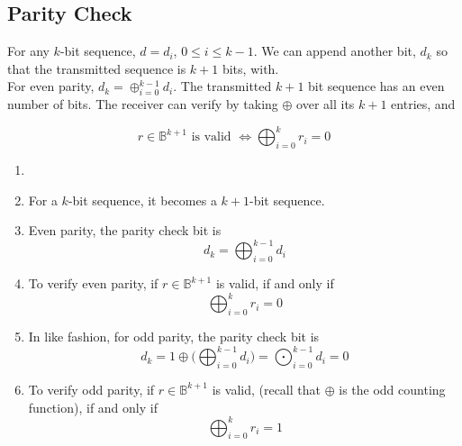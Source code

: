 \documentclass[../../main.tex]{subfiles}
\begin{document}
\subsection{Parity Check}
\begin{definition}
    For any $k$-bit sequence, $d = d_i$, $0\leq i\leq k-1$. We can append another bit, $d_k$ so that the transmitted sequence is $k+1$ bits, with. \\
    
    For even parity, $d_k = \oplus_{i=0}^{k-1}d_i$. The transmitted $k+1$ bit sequence has an even number of bits. The receiver can verify by taking $\oplus$ over all its $k+1$ entries, and 
\end{definition}
    
    \[
    r\in\mathbb{B}^{k+1}\text{ is valid }\iff \bigoplus_{i=0}^{k}r_i = 0
    \]
\begin{wtr}
\begin{enumerate}
    \item[]
    \item For a $k$-bit sequence, it becomes a $k+1$-bit sequence.
    \item Even parity, the parity check bit is
    \[
    d_k = \bigoplus_{i=0}^{k-1}d_i
    \]
    \item To verify even parity, if $r\in \mathbb{B}^{k+1}$ is valid, if and only if
    \[
    \bigoplus_{i=0}^kr_i = 0
    \]
    \item In like fashion, for odd parity, the parity check bit is
    \[
    d_k = 1\oplus\biggl(\bigoplus_{i=0}^{k-1}d_i\biggr)=\bigodot_{i=0}^{k-1}d_i = 0
    \]
    \item To verify odd parity, if $r\in \mathbb{B}^{k+1}$ is valid, (recall that $\oplus$ is the odd counting function), if and only if
    \[
    \bigoplus_{i=0}^kr_i = 1
    \]
\end{enumerate}
\end{wtr}    
\end{document}
